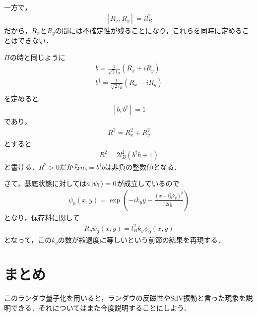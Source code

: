 \documentclass[a4j]{jarticle}
\begin{document}
一方で，
\begin{align*}
 \left[R_x,R_y\right]=il_B^2
\end{align*}
だから，$R_x$と$R_y$の間には不確定性が残ることになり，これらを同時に定めることはできない．

$\Pi$の時と同じように
\begin{align*}
 b=\frac{1}{\sqrt{2}l_B}\left(R_x+iR_y\right) \\
 b^{\dagger}=\frac{1}{\sqrt{2}l_B}\left(R_x-iR_y\right) \\
\end{align*}
を定めると
\begin{align*}
 \left[b,b^{\dagger}\right]=1
\end{align*}
であり，
\begin{align*}
 R^2=R_x^2+R_y^2
\end{align*}
とすると
\begin{align*}
 R^2=2l_B^2\left(b^{\dagger}b+1\right)
\end{align*}
と書ける．$R^2>0$だから$n_b=b^{\dagger}b$は非負の整数値となる．

さて，基底状態に対しては$a\ket{\psi_0}=0$が成立しているので
\begin{align*}
 \psi_0(x,y)=\exp\left(-ik_yy-\frac{(x-l_B^2k_y)^2}{2l_B^2}\right)
\end{align*}
となり，保存料に関して
\begin{align*}
 R_y\psi_0(x,y)=l_B^2k_y\psi_0(x,y)
\end{align*}
となって，この$k_y$の数が縮退度に等しいという前節の結果を再現する．


\section{まとめ}



このランダウ量子化を用いると，ランダウの反磁性やSdV振動と言った現象を説明できる．それについてはまた今度説明することにしよう．
\end{document}
